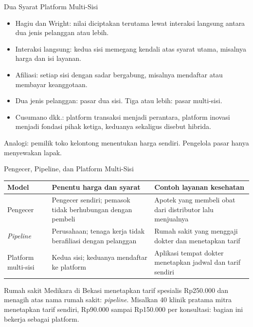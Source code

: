 \documentclass[aspectratio=169, table, 12pt]{beamer}
\begin{document}
\begin{frame}{{\Large Dua Syarat Platform Multi-Sisi}}
  \begin{itemize}
    \item Hagiu dan Wright: nilai diciptakan terutama lewat interaksi langsung antara dua jenis pelanggan atau lebih.
    \item Interaksi langsung: kedua sisi memegang kendali atas syarat utama, misalnya harga dan isi layanan.
    \item Afiliasi: setiap sisi dengan sadar bergabung, misalnya mendaftar atau membayar keanggotaan.
    \item Dua jenis pelanggan: pasar dua sisi. Tiga atau lebih: pasar multi-sisi.
    \item Cusumano dkk.: platform transaksi menjadi perantara, platform inovasi menjadi fondasi pihak ketiga, keduanya sekaligus disebut hibrida.
  \end{itemize}
  \vspace{2pt}
  {\footnotesize Analogi: pemilik toko kelontong menentukan harga sendiri. Pengelola pasar hanya menyewakan lapak.\par}
\end{frame}

\begin{frame}{{\Large Pengecer, Pipeline, dan Platform Multi-Sisi}}
  \footnotesize
  \begin{tabularx}{\textwidth}{>{\raggedright\arraybackslash}p{2.4cm}
      >{\raggedright\arraybackslash}X
      >{\raggedright\arraybackslash}X}
    \hline
    \textbf{Model} & \textbf{Penentu harga dan syarat} & \textbf{Contoh layanan kesehatan} \\ \hline
    Pengecer & Pengecer sendiri; pemasok tidak berhubungan dengan pembeli & Apotek yang membeli obat dari distributor lalu menjualnya \\ \hline
    \textit{Pipeline} & Perusahaan; tenaga kerja tidak berafiliasi dengan pelanggan & Rumah sakit yang menggaji dokter dan menetapkan tarif \\ \hline
    Platform multi-sisi & Kedua sisi; keduanya mendaftar ke platform & Aplikasi tempat dokter menetapkan jadwal dan tarif sendiri \\ \hline
  \end{tabularx}

  \vspace{6pt}
  Rumah sakit Medikara di Bekasi menetapkan tarif spesialis Rp250.000 dan menagih atas nama rumah sakit: \textit{pipeline}. Misalkan 40 klinik pratama mitra menetapkan tarif sendiri, Rp90.000 sampai Rp150.000 per konsultasi: bagian ini bekerja sebagai platform.
\end{frame}
\end{document}
